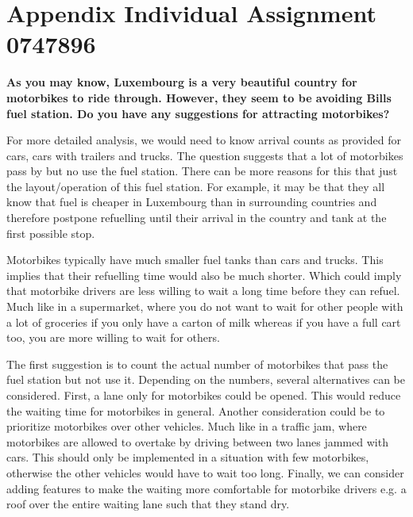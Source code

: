 \section{Appendix Individual Assignment 0747896}\label{app:indivrobbert}
\textbf{As you may know, Luxembourg is a very beautiful country for motorbikes to ride through. However, they seem to be avoiding Bills fuel station. Do you have any suggestions for attracting motorbikes?}

For more detailed analysis, we would need to know arrival counts as provided for cars, cars with trailers and trucks.
The question suggests that a lot of motorbikes pass by but no use the fuel station.
There can be more reasons for this that just the layout/operation of this fuel station. 
For example, it may be that they all know that fuel is cheaper in Luxembourg than in surrounding countries and therefore postpone refuelling until their arrival in the country and tank at the first possible stop.

Motorbikes typically have much smaller fuel tanks than cars and trucks.
This implies that their refuelling time would also be much shorter.
Which could imply that motorbike drivers are less willing to wait a long time before they can refuel. 
Much like in a supermarket, where you do not want to wait for other people with a lot of groceries if you only have a carton of milk whereas if you have a full cart too, you are more willing to wait for others.

The first suggestion is to count the actual number of motorbikes that pass the fuel station but not use it.
Depending on the numbers, several alternatives can be considered.
First, a lane only for motorbikes could be opened.
This would reduce the waiting time for motorbikes in general.
Another consideration could be to prioritize motorbikes over other vehicles.
Much like in a traffic jam, where motorbikes are allowed to overtake by driving between two lanes jammed with cars.
This should only be implemented in a situation with few motorbikes, otherwise the other vehicles would have to wait too long.
Finally, we can consider adding features to make the waiting more comfortable for motorbike drivers e.g. a roof over the entire waiting lane such that they stand dry.


